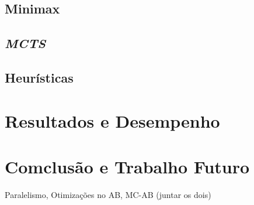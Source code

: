 \documentclass[12pt,a4paper,oneside]{article}
\begin{document}
\lipsum[1]

\subsection{Minimax}

\lipsum[1]

\lipsum[2]

\subsection{\textit{MCTS}}

\lipsum[1]

\lipsum[2]

\lipsum[3]

\subsection{Heurísticas}

\lipsum[1]

\lipsum[2]

\lipsum[3]


\section{Resultados e Desempenho}
\label{sec:resdes}

\lipsum[1]

\lipsum[2]

\lipsum[3]

\section{Comclusão e Trabalho Futuro}
\label{sec:conc}

Paralelismo, Otimizações no AB, MC-AB (juntar os dois)

\lipsum[1]

\lipsum[2]



\end{document}
